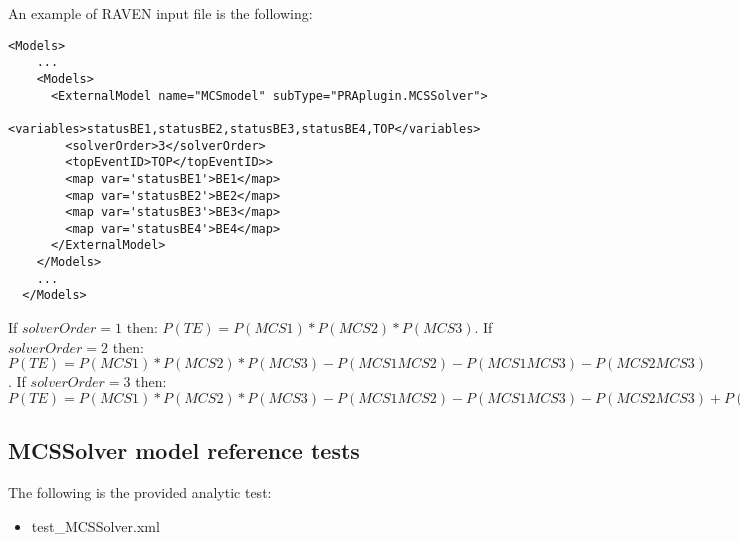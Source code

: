 An example of RAVEN input file is the following:

\begin{lstlisting}[style=XML,morekeywords={anAttribute},caption=MCSSolver model input example., label=lst:MCSSolver_InputExample]
  <Models> 
    ...
    <Models>
      <ExternalModel name="MCSmodel" subType="PRAplugin.MCSSolver">
        <variables>statusBE1,statusBE2,statusBE3,statusBE4,TOP</variables>
        <solverOrder>3</solverOrder>
        <topEventID>TOP</topEventID>>
        <map var='statusBE1'>BE1</map>
        <map var='statusBE2'>BE2</map>
        <map var='statusBE3'>BE3</map>
        <map var='statusBE4'>BE4</map>
      </ExternalModel>
    </Models>
    ...
  </Models>
\end{lstlisting}

If $solverOrder=1$ then: $P(TE) = P(MCS1)*P(MCS2)*P(MCS3)$.  
If $solverOrder=2$ then: $P(TE) = P(MCS1)*P(MCS2)*P(MCS3) - P(MCS1 MCS2) - P(MCS1 MCS3) - P(MCS2 MCS3)$.  
If $solverOrder=3$ then: $P(TE) = P(MCS1)*P(MCS2)*P(MCS3) - P(MCS1 MCS2) - P(MCS1 MCS3) - P(MCS2 MCS3) + P(MCS1 MCS2 MCS3)$

\subsection{MCSSolver model reference tests}
The following is the provided analytic test:
\begin{itemize}
	\item test\_MCSSolver.xml
\end{itemize}



